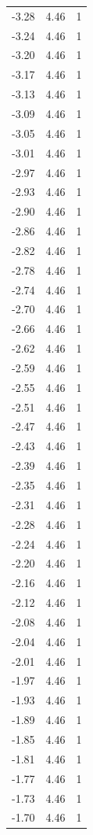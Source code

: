 \begin{longtable}{lrr}
  -3.28 & 4.46 & 1 \\
  -3.24 & 4.46 & 1 \\
  -3.20 & 4.46 & 1 \\
  -3.17 & 4.46 & 1 \\
  -3.13 & 4.46 & 1 \\
  -3.09 & 4.46 & 1 \\
  -3.05 & 4.46 & 1 \\
  -3.01 & 4.46 & 1 \\
  -2.97 & 4.46 & 1 \\
  -2.93 & 4.46 & 1 \\
  -2.90 & 4.46 & 1 \\
  -2.86 & 4.46 & 1 \\
  -2.82 & 4.46 & 1 \\
  -2.78 & 4.46 & 1 \\
  -2.74 & 4.46 & 1 \\
  -2.70 & 4.46 & 1 \\
  -2.66 & 4.46 & 1 \\
  -2.62 & 4.46 & 1 \\
  -2.59 & 4.46 & 1 \\
  -2.55 & 4.46 & 1 \\
  -2.51 & 4.46 & 1 \\
  -2.47 & 4.46 & 1 \\
  -2.43 & 4.46 & 1 \\
  -2.39 & 4.46 & 1 \\
  -2.35 & 4.46 & 1 \\
  -2.31 & 4.46 & 1 \\
  -2.28 & 4.46 & 1 \\
  -2.24 & 4.46 & 1 \\
  -2.20 & 4.46 & 1 \\
  -2.16 & 4.46 & 1 \\
  -2.12 & 4.46 & 1 \\
  -2.08 & 4.46 & 1 \\
  -2.04 & 4.46 & 1 \\
  -2.01 & 4.46 & 1 \\
  -1.97 & 4.46 & 1 \\
  -1.93 & 4.46 & 1 \\
  -1.89 & 4.46 & 1 \\
  -1.85 & 4.46 & 1 \\
  -1.81 & 4.46 & 1 \\
  -1.77 & 4.46 & 1 \\
  -1.73 & 4.46 & 1 \\
  -1.70 & 4.46 & 1 \\

\end{longtable}
